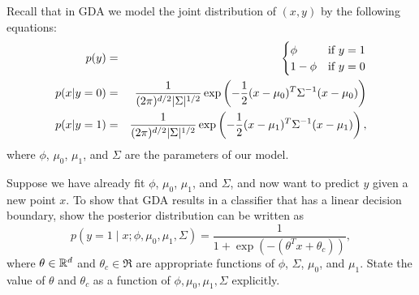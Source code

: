 \item {}
Recall that in GDA we model the joint distribution of $(x, y)$ by the following
equations:
%
\begin{eqnarray*}
	p(y) &=& \begin{cases}
	\phi & \mbox{if~} y = 1 \\
	1 - \phi & \mbox{if~} y = 0 \end{cases} \\
	p(x | y=0) &=& \frac{1}{(2\pi)^{{d}/2} |\Sigma|^{1/2}}
		\exp\left(-\frac{1}{2}(x-\mu_{0})^T \Sigma^{-1} (x-\mu_{0})\right) \\
	p(x | y=1) &=& \frac{1}{(2\pi)^{{d}/2} |\Sigma|^{1/2}}
		\exp\left(-\frac{1}{2}(x-\mu_1)^T \Sigma^{-1} (x-\mu_1) \right),
\end{eqnarray*}
%
where $\phi$, $\mu_0$, $\mu_1$, and $\Sigma$ are the parameters of our model.

Suppose we have already fit $\phi$, $\mu_0$, $\mu_1$, and $\Sigma$, and now
want to predict $y$ given a new point $x$. To show that GDA results in a
classifier that has a linear decision boundary, show the posterior distribution
can be written as
%
\begin{equation*}
	p(y = 1\mid x; \phi, \mu_0, \mu_1, \Sigma)
	= \frac{1}{1 + \exp(-(\theta^T x + \theta_c))},
\end{equation*}
%
where $\theta\in{\mathbb R}^{d}$ and $\theta_c\in\Re$ are appropriate functions of
$\phi$, $\Sigma$, $\mu_0$, and $\mu_1$. State the value of $\theta$ and $\theta_c$ as a function of $\phi, \mu_0, \mu_1, \Sigma$ explicitly.

